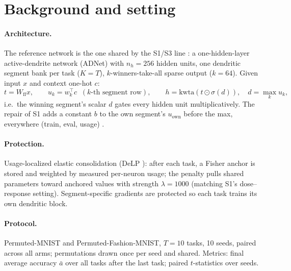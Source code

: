 \documentclass[review,12pt,number]{elsarticle}
\begin{document}
\section{Background and setting}
\label{sec:background}

\paragraph{Architecture.} The reference network is the one shared by the
S1/S3 line \cite{zhou2026delpS1,zhou2026repair}: a one-hidden-layer
active-dendrite network (ADNet) with $n_h{=}256$ hidden units, one
dendritic segment bank per task ($K{=}T$), $k$-winners-take-all sparse
output ($k{=}64$). Given input $x$ and context one-hot $c$:
\begin{equation}
t = W_{\mathrm{ff}} x, \qquad
u_k = w_k^{\top} c \;\; (k\text{-th segment row}), \qquad
h = \mathrm{kwta}\!\left(t \odot \sigma(d)\right), \quad
d = \max_k u_k,
\label{eq:adnet}
\end{equation}
i.e.\ the winning segment's scalar $d$ gates every hidden unit
multiplicatively. The repair of S1 adds a constant $b$ to the own
segment's $u_{\mathrm{own}}$ before the max, everywhere (train, eval,
usage) \cite{zhou2026delpS1}.

\paragraph{Protection.} Usage-localized elastic consolidation (DeLP
\cite{zhou2026audit}): after each task, a Fisher anchor is stored and
weighted by measured per-neuron usage; the penalty pulls shared
parameters toward anchored values with strength $\lambda{=}1000$
(matching S1's dose--response setting). Segment-specific gradients are
protected so each task trains its own dendritic block.

\paragraph{Protocol.} Permuted-MNIST and Permuted-Fashion-MNIST, $T{=}10$
tasks, 10 seeds, paired across all arms; permutations drawn once per seed
and shared. Metrics: final average accuracy $\bar{a}$ over all tasks
after the last task; paired $t$-statistics over seeds.
\end{document}

